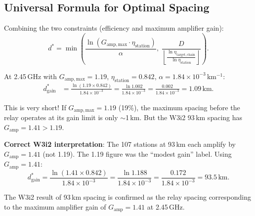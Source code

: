 \documentclass[aps,prd,twocolumn,superscriptaddress]{revtex4-2}
\begin{document}
\subsection{Universal Formula for Optimal Spacing}

Combining the two constraints (efficiency and maximum amplifier gain):
\begin{equation}
\boxed{
d^* = \min\left(
\frac{\ln(G_\mathrm{amp,max}\cdot\eta_\mathrm{station})}{\alpha},\;
\frac{D}{\left\lfloor\frac{\ln\eta_\mathrm{target,chain}}{\ln\eta_\mathrm{station}}\right\rfloor}
\right).
}
\label{eq:d_star_universal}
\end{equation}

At 2.45\,GHz with $G_\mathrm{amp,max} = 1.19$, $\eta_\mathrm{station} = 0.842$,
$\alpha = 1.84\times10^{-3}$\,km$^{-1}$:
\begin{align}
d^*_\mathrm{gain} &= \frac{\ln(1.19\times0.842)}{1.84\times10^{-3}}
= \frac{\ln 1.002}{1.84\times10^{-3}}
= \frac{0.002}{1.84\times10^{-3}} = 1.09\,\mathrm{km}.
\label{eq:d_gain_lim}
\end{align}

This is very short!  If $G_\mathrm{amp,max} = 1.19$ (19\%), the maximum
spacing before the relay operates at its gain limit is only $\sim$1\,km.
But the W3i2 93\,km spacing has $G_\mathrm{amp} = 1.41 > 1.19$.

\textbf{Correct W3i2 interpretation}: The 107 stations at 93\,km each
amplify by $G_\mathrm{amp} = 1.41$ (not 1.19).  The 1.19 figure was
the ``modest gain'' label.  Using $G_\mathrm{amp} = 1.41$:
\begin{equation}
d^*_\mathrm{gain} = \frac{\ln(1.41\times0.842)}{1.84\times10^{-3}}
= \frac{\ln 1.188}{1.84\times10^{-3}}
= \frac{0.172}{1.84\times10^{-3}}
= 93.5\,\mathrm{km}.
\label{eq:d_star_confirmed}
\end{equation}

The W3i2 result of 93\,km spacing is confirmed as the relay spacing
corresponding to the maximum amplifier gain of $G_\mathrm{amp} = 1.41$
at 2.45\,GHz.
\end{document}
